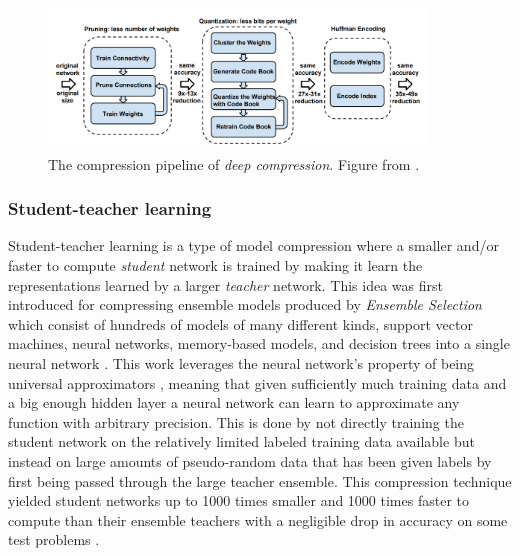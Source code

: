 \documentclass{kththesis}
\newcommand{\bibentry}[1]{\parencite{#1}}
\begin{document}
\begin{figure}[h]
  \centering
  \includegraphics[width=0.9\textwidth]{DeepCompression}
  \caption{The compression pipeline of \textit{deep compression}. Figure from \textcite[]{han2015deep}.}
  \label{fig:DeepCompression}
  \end{figure}

\subsubsection{Student-teacher learning}
Student-teacher learning is a type of model compression where a smaller and/or
faster to compute \emph{student} network is trained by making it learn the
representations learned by a larger \emph{teacher} network. This idea was first
introduced for compressing ensemble models produced by \emph{Ensemble Selection}
\bibentry{caruana2004ensemble} which consist of hundreds of models of many
different kinds, support vector machines, neural networks, memory-based models,
and decision trees into a single neural network \bibentry{bucilua2006model}.
This work leverages the neural network's property of being universal
approximators \bibentry{cybenko1989approximation}, meaning that given
sufficiently much training data and a big enough hidden layer a neural network
can learn to approximate any function with arbitrary precision. This is done by not directly
training the student network on the relatively limited labeled training data
available but instead on large amounts of pseudo-random data that has been given
labels by first being passed through the large teacher ensemble. This
compression technique yielded student networks up to 1000 times smaller and 1000
times faster to compute than their ensemble teachers with a negligible drop in accuracy
on some test problems \parencite{bucilua2006model}. 
\end{document}

